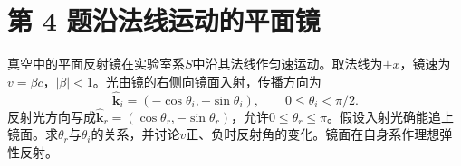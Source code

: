 \documentclass[UTF8,fontset=fandol,a4paper,11pt]{ctexart}
\begin{document}


\section*{第 4 题\quad 沿法线运动的平面镜}\label{q:4}

真空中的平面反射镜在实验室系$S$中沿其法线作匀速运动。取法线为$+x$，镜速为$v=\beta c$，$|\beta|<1$。光由镜的右侧向镜面入射，传播方向为
\[
\hat{\boldsymbol k}_i=(-\cos\theta_i,-\sin\theta_i),
\qquad 0\le\theta_i<\pi/2.
\]
反射光方向写成$\hat{\boldsymbol k}_r=(\cos\theta_r,-\sin\theta_r)$，允许$0\le\theta_r\le\pi$。假设入射光确能追上镜面。求$\theta_r$与$\theta_i$的关系，并讨论$v$正、负时反射角的变化。镜面在自身系作理想弹性反射。
\end{document}
